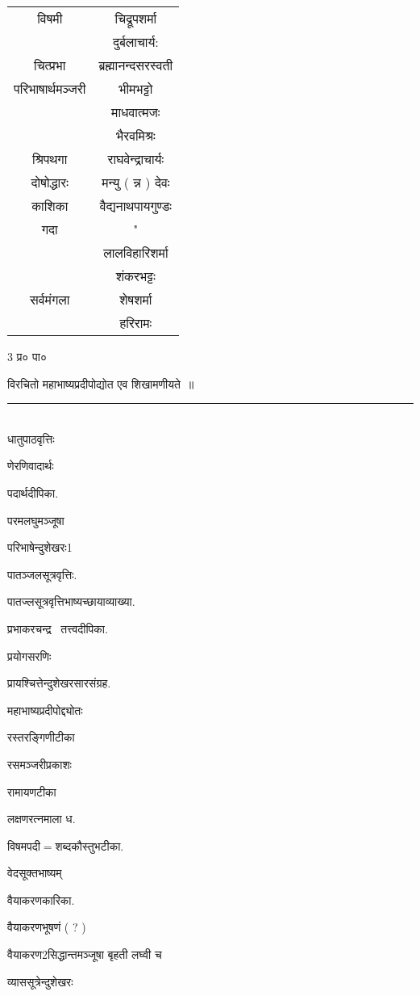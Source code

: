 \documentclass[11pt, openany]{book}
\begin{document}
\begin{multicols}{2}
\begin{tabular}{c c}
विषमी & चिद्रूपशर्मा\\
& दुर्बलाचार्य: \\
चित्प्रभा& ब्रह्मानन्दसरस्वती \\
परिभाषार्थमञ्जरी& भीमभट्टो \\
& माधवात्मजः \\
& भैरवमिश्रः \\
श्रिपथगा & राघवेन्द्राचार्यः \\
दोषोद्धारः& मन्यु ( न्न ) देवः \\
काशिका & वैद्यनाथपायगुण्डः \\
गदा & "\\
& लालविहारिशर्मा \\
& शंकरभट्टः \\
सर्वमंगला &शेषशर्मा \\
& हरिरामः
\end{tabular}

3 प्र० पा०

\columnbreak

विरचितो महाभाष्यप्रदीपोद्योत एव शिखामणीयते~॥\\
\rule{1\linewidth}{0.5pt}\\

धातुपाठवृत्तिः 

णेरणिवादार्थः 

पदार्थदीपिका. 

परमलघुमञ्जूषा 

परिभाषेन्दुशेखरः1 

पातञ्जलसूत्रवृत्तिः. 

पातज्लसूत्रवृत्तिभाष्यच्छायाव्याख्या. 

प्रभाकरचन्द्र \textendash\ तत्त्वदीपिका. 

प्रयोगसरणिः 

प्रायश्चित्तेन्दुशेखरसारसंग्रह. 

महाभाष्यप्रदीपोद्द्योतः 

रस्तरङ्गिणीटीका 

रसमञ्जरीप्रकाशः 

रामायणटीका 

लक्षणरत्नमाला ध. 

विषमपदी$=$शब्दकौस्तुभटीका. 

वेदसूक्तभाष्यम् 

वैयाकरणकारिका. 

वैयाकरणभूषणं ( ? ) 

वैयाकरण2सिद्धान्तमञ्जूषा बृहती लघ्वी च 

 व्याससूत्रेन्दुशेखरः 


\end{multicols}
\end{document}

